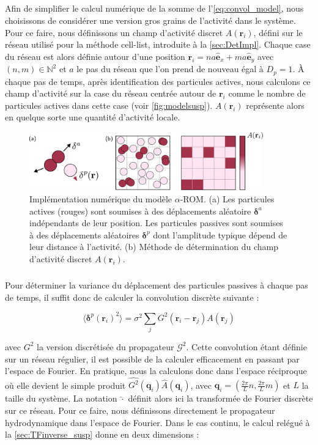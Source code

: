 \subparagraph{}Afin de simplifier le calcul numérique de la somme de l'\autoref{eq:convol_model}, nous choisissons de considérer une version gros grains de l'activité dans le système. Pour ce faire, nous définissons un champ d'activité discret $A(\mathbf{r}_i)$, défini sur le réseau utilisé pour la méthode cell-list, introduite à la \autoref{sec:DetImpl}. Chaque case du réseau est alors définie autour d'une position $\mathbf{r}_i = na\hat{\mathbf{e}}_x + ma \hat{\mathbf{e}}_y$ avec $(n,m) \in \mathbb{N}^2$ et $a$ le pas du réseau que l'on prend de nouveau égal à $D_p=1$. \`A chaque pas de temps, après identification des particules actives, nous calculons ce champ d'activité sur la case du réseau centrée autour de $\mathbf{r}_i$ comme le nombre de particules actives dans cette case (voir \autoref{fig:modelsusp}). $A(\mathbf{r}_i)$ représente alors en quelque sorte une quantité d'activité locale.

\begin{figure}[h]
	\centering
	\includegraphics[width=0.9\textwidth]{Chapitre3/Figures/Method/Model.pdf}
	\caption{Implémentation numérique du modèle $\alpha$-ROM. (a) Les particules actives (rouges) sont soumises à des déplacements aléatoire $\boldsymbol\delta^a$ indépendants de leur position. Les particules passives sont soumises à des déplacements aléatoires $\boldsymbol\delta^p$ dont l'amplitude typique dépend de leur distance à l'activité. (b) Méthode de détermination du champ d'activité discret $A(\mathbf{r}_i)$.}
	\label{fig:modelsusp}
\end{figure}

\subparagraph{}Pour déterminer la variance du déplacement des particules passives à chaque pas de temps, il suffit donc de calculer la convolution discrète suivante :

\begin{equation}
	\langle \boldsymbol\delta^p(\mathbf{r}_i)^2\rangle = \sigma^2\sum_{j} G^2(\mathbf{r}_i-\mathbf{r}_j) A(\mathbf{r}_j)
	\label{eq:kick_discret}
\end{equation}

\noindent avec $G^2$ la version discrétisée du propagateur $\mathcal{G}^2$. Cette convolution étant définie sur un réseau régulier, il est possible de la calculer efficacement en passant par l'espace de Fourier. En pratique, nous la calculons donc dans l'espace réciproque où elle devient le simple produit $\hat{G^2}(\mathbf{q}_i)\hat{A}(\mathbf{q}_i)$, avec $\mathbf{q}_i = (\frac{2\pi}{L}n, \frac{2\pi}{L}m)$ et $L$ la taille du système. La notation $\hat{\cdot}$ définit alors ici la transformée de Fourier discrète sur ce réseau. Pour ce faire, nous définissons directement le propagateur hydrodynamique dans l'espace de Fourier. Dans le cas continu, le calcul relégué à la \autoref{sec:TFinverse_susp} donne en deux dimensions :

